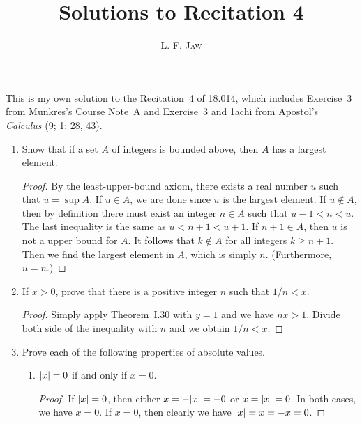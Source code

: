 \documentclass[a4paper]{article}
\title{Solutions to Recitation 4}
\author{L. F. \textsc{Jaw}}
\begin{document}
\maketitle

This is my own solution to the Recitation~4 of
\href{https://ocw.mit.edu/courses/mathematics/18-014-calculus-with-theory-fall-2010/recitations/}{18.014},
which includes Exercise~3 from Munkres's Course Note~A and Exercise~3 and
1achi from Apostol's \textit{Calculus} (9; 1: 28, 43).

\begin{enumerate}
\item Show that if a set \(A\) of integers is bounded above, then
  \(A\) has a largest element.

  \begin{proof}
    By the least-upper-bound axiom, there exists a real number \(u\) such
    that \(u = \sup A\).  If \(u \in A\), we are done since \(u\) is the
    largest element.  If \(u \notin A\), then by definition there must
    exist an integer \(n \in A\) such that \(u-1 < n < u\).  The last
    inequality is the same as \(u < n+1 < u+1\).  If \(n+1 \in A\), then
    \(u\) is not a upper bound for \(A\).  It follows that \(k \notin A\)
    for all integers \(k \ge n+1\).  Then we find the largest element in
    \(A\), which is simply \(n\).  (Furthermore, \(u = n\).)
  \end{proof}

\item If \(x > 0\), prove that there is a positive integer \(n\) such that
  \(1/n < x\).

  \begin{proof}
    Simply apply Theorem~I.30 with \(y = 1\) and we have \(nx > 1\).
    Divide both side of the inequality with \(n\) and we obtain
    \(1/n < x\).
  \end{proof}

\item Prove each of the following properties of absolute values.
  \begin{enumerate}
  \item \(\lvert x\rvert = 0\) if and only if \(x = 0\).

    \begin{proof}
      If \(\lvert x\rvert = 0\), then either \(x = -\lvert x\rvert = -0\) or
      \(x = \lvert x\rvert = 0\).  In both cases, we have \(x = 0\).  If
      \(x = 0\), then clearly we have \(\lvert x\rvert = x = -x = 0\).
    \end{proof}


\end{enumerate}
\end{enumerate}
\end{document}
